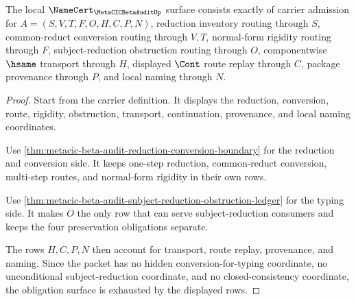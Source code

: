 \begin{theorem}
\label{thm:metacic-beta-audit-namecert-obligations}
The local $\NameCert_{\MetaCICBetaAuditUp}$ surface consists exactly of carrier admission for $A=(S,V,T,F,O,H,C,P,N)$, reduction inventory routing through $S$, common-reduct conversion routing through $V,T$, normal-form rigidity routing through $F$, subject-reduction obstruction routing through $O$, componentwise $\hsame$ transport through $H$, displayed $\Cont$ route replay through $C$, package provenance through $P$, and local naming through $N$.
\end{theorem}
\begin{proof}
Start from the carrier definition. It displays the reduction, conversion, route, rigidity, obstruction, transport, continuation, provenance, and local naming coordinates.

Use \autoref{thm:metacic-beta-audit-reduction-conversion-boundary} for the reduction and conversion side. It keeps one-step reduction, common-reduct conversion, multi-step routes, and normal-form rigidity in their own rows.

Use \autoref{thm:metacic-beta-audit-subject-reduction-obstruction-ledger} for the typing side. It makes $O$ the only row that can serve subject-reduction consumers and keeps the four preservation obligations separate.

The rows $H,C,P,N$ then account for transport, route replay, provenance, and naming. Since the packet has no hidden conversion-for-typing coordinate, no unconditional subject-reduction coordinate, and no closed-consistency coordinate, the obligation surface is exhausted by the displayed rows.
\end{proof}

